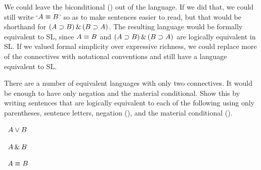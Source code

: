 \problempart
{}\label{pr.altConnectives}
We could leave the biconditional (\eiff) out of the language. If we did that, we could still write `$A\equiv B$' so as to make sentences easier to read, but that would be shorthand for $(A\supset B) \,\&\, (B\supset A)$. The resulting language would be formally equivalent to SL, since $A\equiv B$ and $(A\supset B) \,\&\, (B\supset A)$ are logically equivalent in SL. If we valued formal simplicity over expressive richness, we could replace more of the connectives with notational conventions and still have a language equivalent to SL. 

There are a number of equivalent languages with only two connectives. It would be enough to have only negation and the material conditional. Show this by writing sentences that are logically equivalent to each of the following using only parentheses, sentence letters, negation (\enot), and the material conditional (\eif).
\begin{earg}
\item\leftsolutions\ $A\vee B$
\item\leftsolutions\ $A\,\&\, B$
\item\leftsolutions\ $A\equiv B$
\end{earg}

